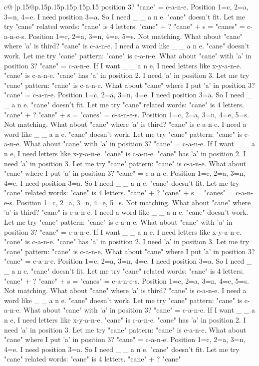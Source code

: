 \documentclass{article}
\begin{document}
{\begin{supertabular}{c@{$\;$}|p{.15\linewidth}@{}p{.15\linewidth}p{.15\linewidth}p{.15\linewidth}p{.15\linewidth}p{.15\linewidth}}
{{{position 3? "cane" = c{-}a{-}n{-}e. Position 1=c, 2=a, 3=n, 4=e. I need position 3=a. So I need \_ \_ a n e. "cane" doesn't fit. Let me try "cane" related words: "cane" is 4 letters. "cane" + ? "cane" + s = "canes" = c{-}a{-}n{-}e{-}s. Position 1=c, 2=a, 3=n, 4=e, 5=s. Not matching. What about "cane" where 'a' is third? "cane" is c{-}a{-}n{-}e. I need a word like \_ \_ a n e. "cane" doesn't work. Let me try "cane" pattern: "cane" is c{-}a{-}n{-}e. What about "cane" with 'a' in position 3? "cane" = c{-}a{-}n{-}e. If I want \_ \_ a n e, I need letters like x{-}y{-}a{-}n{-}e. "cane" is c{-}a{-}n{-}e. "cane" has 'a' in position 2. I need 'a' in position 3. Let me try "cane" pattern: "cane" is c{-}a{-}n{-}e. What about "cane" where I put 'a' in position 3? "cane" = c{-}a{-}n{-}e. Position 1=c, 2=a, 3=n, 4=e. I need position 3=a. So I need \_ \_ a n e. "cane" doesn't fit. Let me try "cane" related words: "cane" is 4 letters. "cane" + ? "cane" + s = "canes" = c{-}a{-}n{-}e{-}s. Position 1=c, 2=a, 3=n, 4=e, 5=s. Not matching. What about "cane" where 'a' is third? "cane" is c{-}a{-}n{-}e. I need a word like \_ \_ a n e. "cane" doesn't work. Let me try "cane" pattern: "cane" is c{-}a{-}n{-}e. What about "cane" with 'a' in position 3? "cane" = c{-}a{-}n{-}e. If I want \_ \_ a n e, I need letters like x{-}y{-}a{-}n{-}e. "cane" is c{-}a{-}n{-}e. "cane" has 'a' in position 2. I need 'a' in position 3. Let me try "cane" pattern: "cane" is c{-}a{-}n{-}e. What about "cane" where I put 'a' in position 3? "cane" = c{-}a{-}n{-}e. Position 1=c, 2=a, 3=n, 4=e. I need position 3=a. So I need \_ \_ a n e. "cane" doesn't fit. Let me try "cane" related words: "cane" is 4 letters. "cane" + ? "cane" + s = "canes" = c{-}a{-}n{-}e{-}s. Position 1=c, 2=a, 3=n, 4=e, 5=s. Not matching. What about "cane" where 'a' is third? "cane" is c{-}a{-}n{-}e. I need a word like \_ \_ a n e. "cane" doesn't work. Let me try "cane" pattern: "cane" is c{-}a{-}n{-}e. What about "cane" with 'a' in position 3? "cane" = c{-}a{-}n{-}e. If I want \_ \_ a n e, I need letters like x{-}y{-}a{-}n{-}e. "cane" is c{-}a{-}n{-}e. "cane" has 'a' in position 2. I need 'a' in position 3. Let me try "cane" pattern: "cane" is c{-}a{-}n{-}e. What about "cane" where I put 'a' in position 3? "cane" = c{-}a{-}n{-}e. Position 1=c, 2=a, 3=n, 4=e. I need position 3=a. So I need \_ \_ a n e. "cane" doesn't fit. Let me try "cane" related words: "cane" is 4 letters. "cane" + ? "cane" + s = "canes" = c{-}a{-}n{-}e{-}s. Position 1=c, 2=a, 3=n, 4=e, 5=s. Not matching. What about "cane" where 'a' is third? "cane" is c{-}a{-}n{-}e. I need a word like \_ \_ a n e. "cane" doesn't work. Let me try "cane" pattern: "cane" is c{-}a{-}n{-}e. What about "cane" with 'a' in position 3? "cane" = c{-}a{-}n{-}e. If I want \_ \_ a n e, I need letters like x{-}y{-}a{-}n{-}e. "cane" is c{-}a{-}n{-}e. "cane" has 'a' in position 2. I need 'a' in position 3. Let me try "cane" pattern: "cane" is c{-}a{-}n{-}e. What about "cane" where I put 'a' in position 3? "cane" = c{-}a{-}n{-}e. Position 1=c, 2=a, 3=n, 4=e. I need position 3=a. So I need \_ \_ a n e. "cane" doesn't fit. Let me try "cane" related words: "cane" is 4 letters. "cane" + ? "cane" }}}
\end{supertabular}}
\end{document}
